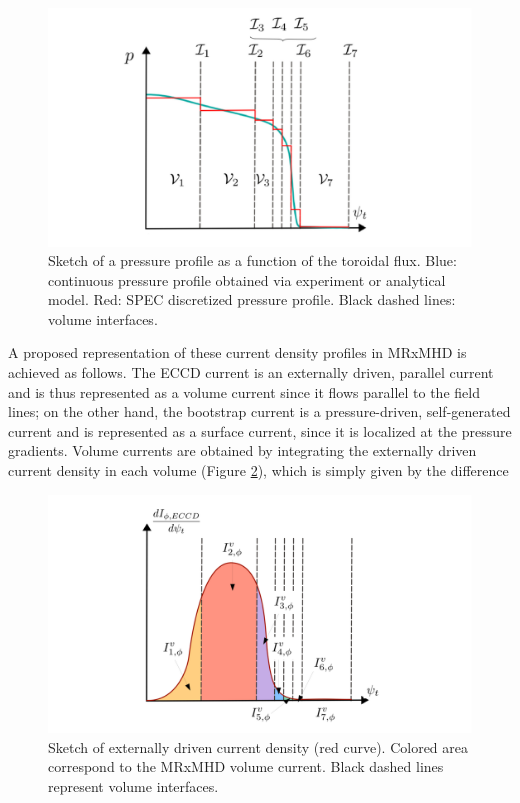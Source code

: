 \documentclass[my_thesis.tex]{subfiles}
\begin{document}
\begin{figure}
    \centering
    \includegraphics[width=\linewidth]{main/Figures_CurrentConstraint/ABaillod_fig2.pdf}
    \caption{Sketch of a pressure profile as a function of the toroidal flux. Blue: continuous pressure profile obtained via experiment or analytical model. Red: SPEC discretized pressure profile. Black dashed lines: volume interfaces.}
    \label{fig:sketch_pressure}
\end{figure}

A proposed representation of these current density profiles in \ac{MRxMHD} is achieved as follows. The \ac{ECCD} current is an externally driven, parallel current and is thus represented as a volume current since it flows parallel to the field lines; on the other hand, the bootstrap current is a pressure-driven, self-generated current and is represented as a surface current, since it is localized at the pressure gradients. Volume currents are obtained by integrating the externally driven current density in each volume (Figure \ref{fig:sketch_eccd}), which is simply given by the difference

\begin{figure}
    \centering
    \includegraphics[width=\linewidth]{main/Figures_CurrentConstraint/ABaillod_fig3.pdf}
    \caption{Sketch of externally driven current density (red curve). Colored area correspond to the \ac{MRxMHD} volume current. Black dashed lines represent volume interfaces.}
    \label{fig:sketch_eccd}
\end{figure}
\end{document}
